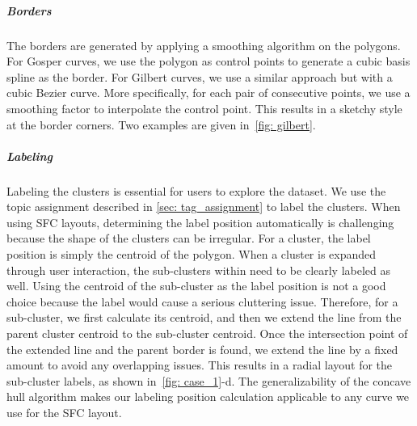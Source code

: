 \vspace*{-0.3cm}
\subparagraph{Borders} 
The borders are generated by applying a smoothing algorithm on the polygons.
For Gosper curves, we use the polygon as control points to generate a cubic basis spline as the border.
For Gilbert curves, we use a similar approach but with a cubic Bezier curve.
More specifically, for each pair of consecutive points, we use a smoothing factor to interpolate the control point.
This results in a sketchy style at the border corners.
Two examples are given in~\autoref{fig: gilbert}.

\vspace*{-0.3cm}
\subparagraph{Labeling}
Labeling the clusters is essential for users to explore the dataset.
We use the topic assignment described in \autoref{sec: tag_assignment} to label the clusters.
When using SFC layouts, determining the label position automatically is challenging because the shape of the clusters can be irregular.
For a cluster, the label position is simply the centroid of the polygon.
When a cluster is expanded through user interaction, the sub-clusters within need to be clearly labeled as well.
Using the centroid of the sub-cluster as the label position is not a good choice because the label would cause a serious cluttering issue.
Therefore, for a sub-cluster, we first calculate its centroid, and then we extend the line from the parent cluster centroid to the sub-cluster centroid. 
Once the intersection point of the extended line and the parent border is found, we extend the line by a fixed amount to avoid any overlapping issues.
This results in a radial layout for the sub-cluster labels, as shown in~\autoref{fig: case_1}-d.
The generalizability of the concave hull algorithm makes our labeling position calculation applicable to any curve we use for the SFC layout.

